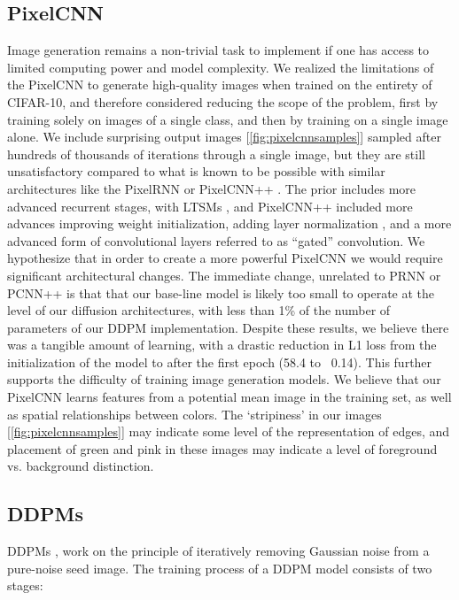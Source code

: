 \documentclass[10pt,twocolumn,letterpaper]{article}
\begin{document}
\subsection{PixelCNN}
Image generation remains a non-trivial task to implement if one has access to limited computing power and model complexity. We realized the limitations of the PixelCNN to generate high-quality images when trained on the entirety of CIFAR-10, and therefore considered reducing the scope of the problem, first by training solely on images of a single class, and then by training on a single image alone. We include surprising output images [\ref{fig:pixelcnnsamples}] sampled after hundreds of thousands of iterations through a single image, but they are still unsatisfactory compared to what is known to be possible with similar architectures like the PixelRNN \cite{pixelrnn} or PixelCNN++ \cite{Salimans2017PixeCNN}. The prior includes more advanced recurrent stages, with LTSMs \cite{HochSchm97}, and PixelCNN++ included more advances improving weight initialization, adding layer normalization \cite{ba2016layer}, and a more advanced form of convolutional layers referred to as “gated” convolution. We hypothesize that in order to create a more powerful PixelCNN we would require significant architectural changes. The immediate change, unrelated to PRNN or PCNN++ is that that our base-line model is likely too small to operate at the level of our diffusion architectures, with less than 1\%  of the number of parameters of our DDPM implementation. Despite these results, we believe there was a tangible amount of learning, with a drastic reduction in L1 loss from the initialization of the model to after the first epoch (58.4 to ~0.14). This further supports the difficulty of training image generation models. We believe that our PixelCNN learns features from a potential mean image in the training set, as well as spatial relationships between colors. The `stripiness' in our images [\ref{fig:pixelcnnsamples}] may indicate some level of the representation of edges, and placement of green and pink in these images may indicate a level of foreground vs. background distinction.

\subsection{DDPMs}
DDPMs \cite{DDPM}, work on the principle of iteratively removing Gaussian noise from a pure-noise seed image. The training process of a DDPM model consists of two stages:
\end{document}
